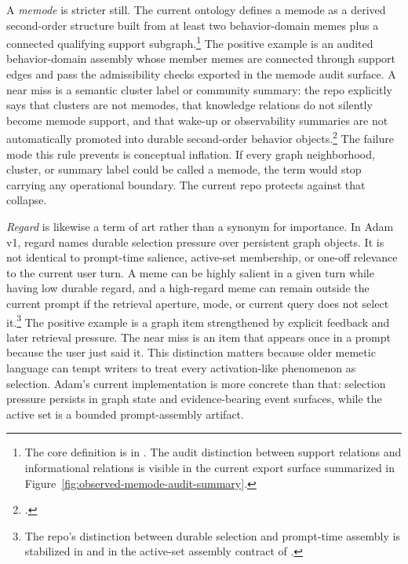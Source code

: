 \documentclass[10pt]{article}
\begin{document}
A \emph{memode} is stricter still. The current ontology defines a memode as a derived second-order structure built from at least two behavior-domain memes plus a connected qualifying support subgraph.\footnote{The core definition is in . The audit distinction between support relations and informational relations is visible in the current export surface summarized in Figure~\ref{fig:observed-memode-audit-summary}.} The positive example is an audited behavior-domain assembly whose member memes are connected through support edges and pass the admissibility checks exported in the memode audit surface. A near miss is a semantic cluster label or community summary: the repo explicitly says that clusters are not memodes, that knowledge relations do not silently become memode support, and that wake-up or observability summaries are not automatically promoted into durable second-order behavior objects.\footnote{.} The failure mode this rule prevents is conceptual inflation. If every graph neighborhood, cluster, or summary label could be called a memode, the term would stop carrying any operational boundary. The current repo protects against that collapse.

\emph{Regard} is likewise a term of art rather than a synonym for importance. In Adam v1, regard names durable selection pressure over persistent graph objects. It is not identical to prompt-time salience, active-set membership, or one-off relevance to the current user turn. A meme can be highly salient in a given turn while having low durable regard, and a high-regard meme can remain outside the current prompt if the retrieval aperture, mode, or current query does not select it.\footnote{The repo's distinction between durable selection and prompt-time assembly is stabilized in  and in the active-set assembly contract of .} The positive example is a graph item strengthened by explicit feedback and later retrieval pressure. The near miss is an item that appears once in a prompt because the user just said it. This distinction matters because older memetic language can tempt writers to treat every activation-like phenomenon as selection. Adam's current implementation is more concrete than that: selection pressure persists in graph state and evidence-bearing event surfaces, while the active set is a bounded prompt-assembly artifact.
\end{document}
